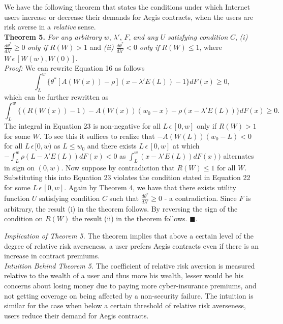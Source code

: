 \documentclass[letterpaper,12pt, onecolumn, nodraft]{IEEEtran}
\begin{document}
We have the following theorem that states the conditions under which Internet users increase or decrease their demands for Aegis contracts, when the users are risk averse in a \emph{relative} sense. \\ 
\textbf{Theorem 5.} \emph{For any arbitrary} $w$, $\lambda'$, $F$, \emph{and any} $U$ \emph{satisfying condition} $C$, \emph{(i)} $\frac{d\theta^{*}}{d\lambda'} \ge 0$ \emph{only if} $R(W) > 1$ and  \emph{(ii)} $\frac{d\theta^{*}}{d\lambda'} < 0$ \emph{only if} $R(W) \le 1$, where $W\,\epsilon\,[W(w), W(0)]$. \\

\emph{Proof:} We can rewrite Equation 16 as follows
\begin{equation}
\int_{L}^{w}\{\theta^{*}[A(W(x)) - \rho](x - \lambda'E(L)) - 1\}dF(x) \ge 0,
\end{equation}
which can be further rewritten as 
\begin{equation}
\int_{L}^{w}\{(R(W(x)) - 1) - A(W(x))(w_{0} - x) - \rho(x - \lambda'E(L))\}dF(x) \ge 0.
\end{equation}
The integral in Equation 23 is non-negative for all $L\,\epsilon\,[0,w]$ only if $R(W) > 1$ for some $W$. To see this it suffices to realize that $-A(W(L))(w_{0} - L) < 0$ for all $L\,\epsilon\,[0,w)$ as $L \le w_{0}$ and there exists $L\,\epsilon\,[0,w]$ at which $-\int_{L}^{w}\rho(L - \lambda'E(L))dF(x) < 0$ as $\int_{L}^{w}(x - \lambda'E(L))dF(x))$ alternates in sign on $(0,w)$. Now suppose by contradiction that $R(W) \le 1$ for all $W$. Substituting this into Equation 23 violates the condition stated in Equation 22 for some $L\,\epsilon\,[0,w]$.  Again by Theorem 4, we have that there exists utility function $U$ satisfying condition $C$ such that  $\frac{d\theta^{*}}{d\lambda'} \ge 0$ - a contradiction. Since $F$ is arbitrary, the result (i) in the theorem follows. By reversing the sign of the condition on $R(W)$ the result (ii) in the theorem follows. $\blacksquare$. 

\emph{Implication of Theorem 5.} The theorem implies that above a certain level of the degree of relative risk averseness, a user prefers Aegis contracts even if there is an increase in contract premiums. \\
\emph{Intuition Behind Theorem 5.} The coefficient of relative risk aversion is measured relative to the wealth of a user and thus more his wealth, lesser would be his concerns about losing money due to paying more cyber-insurance premiums, and not getting coverage on being affected by a non-security failure. The intuition is similar for the case when below a certain threshold of relative risk averseness, users reduce their demand for Aegis contracts. 
\end{document}
